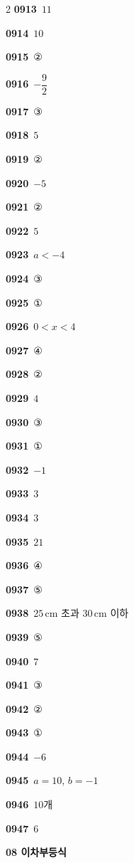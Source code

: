 \documentclass[10pt,a4paper]{article}
\begin{document}
\begin{multicols}{2}
\noindent\textbf{0913}\ $11$\par
\noindent\textbf{0914}\ $10$\par
\noindent\textbf{0915}\ ②\par
\noindent\textbf{0916}\ $-\dfrac{9}{2}$\par
\noindent\textbf{0917}\ ③\par
\noindent\textbf{0918}\ $5$\par
\noindent\textbf{0919}\ ②\par
\noindent\textbf{0920}\ $-5$\par
\noindent\textbf{0921}\ ②\par
\noindent\textbf{0922}\ $5$\par
\noindent\textbf{0923}\ $a<-4$\par
\noindent\textbf{0924}\ ③\par
\noindent\textbf{0925}\ ①\par
\noindent\textbf{0926}\ $0<x<4$\par
\noindent\textbf{0927}\ ④\par
\noindent\textbf{0928}\ ②\par
\noindent\textbf{0929}\ $4$\par
\noindent\textbf{0930}\ ③\par
\noindent\textbf{0931}\ ①\par
\noindent\textbf{0932}\ $-1$\par
\noindent\textbf{0933}\ $3$\par
\noindent\textbf{0934}\ $3$\par
\noindent\textbf{0935}\ $21$\par
\noindent\textbf{0936}\ ④\par
\noindent\textbf{0937}\ ⑤\par
\noindent\textbf{0938}\ $25\,\mathrm{cm}$ 초과 $30\,\mathrm{cm}$ 이하\par
\noindent\textbf{0939}\ ⑤\par
\noindent\textbf{0940}\ $7$\par
\noindent\textbf{0941}\ ③\par
\noindent\textbf{0942}\ ②\par
\noindent\textbf{0943}\ ①\par
\noindent\textbf{0944}\ $-6$\par
\noindent\textbf{0945}\ $a=10$, $b=-1$\par
\noindent\textbf{0946}\ $10$개\par
\noindent\textbf{0947}\ $6$\par
\noindent\textbf{08 이차부등식}\par\smallskip

\end{multicols}
\end{document}
